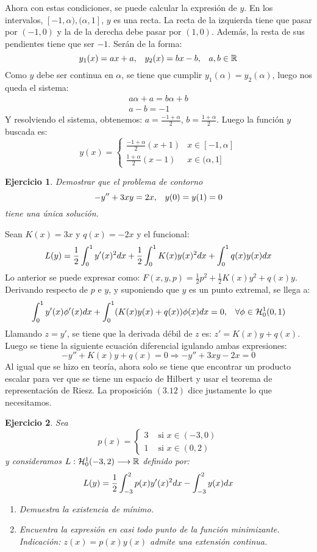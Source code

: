 \documentclass[12pt]{article}
\newtheorem{ejercicio}{Ejercicio}
\theoremstyle{definition}
\theoremstyle{remark}
\begin{document}
Ahora con estas condiciones, se puede calcular la expresión de $y$. En los intervalos, $[-1,\alpha),(\alpha,1]$, $y$ es una recta. La recta de la izquierda tiene que pasar por $(-1,0)$ y la de la derecha debe pasar por $(1,0)$. Además, la resta de sus pendientes tiene que ser $-1$. Serán de la forma:
\[
y_1(x)=ax+a, \espacio y_2(x)=bx-b, \espacio a,b\in\R
\]
Como $y$ debe ser continua en $\alpha$, se tiene que cumplir $y_1(\alpha)=y_2(\alpha)$, luego nos queda el sistema:
\[
\begin{array}{l}
a\alpha+a=b\alpha+b\\
a-b=-1
\end{array}
\]
Y resolviendo el sistema, obtenemos: $a=\frac{-1+\alpha}{2}$, $b=\frac{1+\alpha}{2}$. Luego la función $y$ buscada es:
\[
y(x)=\left\{
\begin{array}{ll}
\frac{-1+\alpha}{2}(x+1) & x\in[-1,\alpha]\\
\frac{1+\alpha}{2}(x-1) & x\in(\alpha,1]
\end{array}
\right.
\]
\begin{ejercicio}
Demostrar que el problema de contorno
\[
-y''+3xy=2x, \espacio y(0)=y(1)=0
\]
tiene una única solución.
\end{ejercicio}

Sean $K(x)=3x$ y $q(x)=-2x$ y el funcional:
\[
L(y)=\frac{1}{2}\integral{0}{1}{y'(x)^2dx}+\frac{1}{2}\integral{0}{1}{K(x)y(x)^2dx}+\integral{0}{1}{q(x)y(x)dx}
\]
Lo anterior se puede expresar como: $F(x,y,p)=\frac{1}{2}p^2+\frac{1}{2}K(x)y^2+q(x)y$. Derivando respecto de $p$ e $y$, y suponiendo que $y$ es un punto extremal, se llega a:
\[
\integral{0}{1}{y'(x)\phi'(x)dx}+\integral{0}{1}{(K(x)y(x)+q(x))\phi(x)dx}=0, \espacio \forall \phi \in \sobolevcero[0,1]{1}
\]
Llamando $z=y'$, se tiene que la derivada débil de $z$ es: $z'=K(x)y+q(x)$. Luego se tiene la siguiente ecuación diferencial igulando ambas expresiones:
\[
-y''+K(x)y+q(x)=0\Rightarrow -y''+3xy-2x=0
\]
Al igual que se hizo en teoría, ahora solo se tiene que encontrar un producto escalar para ver que se tiene un espacio de Hilbert y usar el teorema de representación de Riesz. La proposición $(3.12)$ dice justamente lo que necesitamos.

\begin{ejercicio}
Sea
\[
p(x)=\left\{
\begin{array}{lr}
3 & \text{ si } x\in(-3,0)\\
1 & \text{ si } x\in(0,2)
\end{array}
\right.
\]
y consideramos $\funcion{L}{\sobolevcero[-3,2]{1}}{\R}$ definido por:
\[
L(y)=\frac{1}{2}\integral{-3}{2}{p(x)y'(x)^2dx}-\integral{-3}{2}{y(x)dx}
\]
\begin{enumerate}
\item Demuestra la existencia de mínimo.
\item Encuentra la expresión en casi todo punto de la función minimizante. Indicación: $z(x)=p(x)y(x)$ admite una extensión continua. 
\end{enumerate}
\end{ejercicio}
\end{document}
